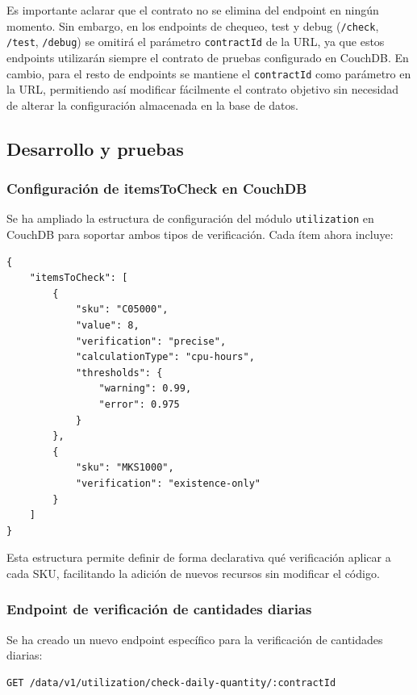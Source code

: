 Es importante aclarar que el contrato no se elimina del endpoint en ningún momento. Sin embargo, en los endpoints de chequeo, test y debug (\texttt{/check}, \texttt{/test}, \texttt{/debug}) se omitirá el parámetro \texttt{contractId} de la URL, ya que estos endpoints utilizarán siempre el contrato de pruebas configurado en CouchDB. En cambio, para el resto de endpoints se mantiene el \texttt{contractId} como parámetro en la URL, permitiendo así modificar fácilmente el contrato objetivo sin necesidad de alterar la configuración almacenada en la base de datos.

\subsection{Desarrollo y pruebas}

\subsubsection{Configuración de itemsToCheck en CouchDB}
Se ha ampliado la estructura de configuración del módulo \texttt{utilization} en CouchDB para soportar ambos tipos de verificación. Cada ítem ahora incluye:

\begin{lstlisting}[caption=Estructura de itemsToCheck en CouchDB, label=lst:items-to-check]
{
    "itemsToCheck": [
        {
            "sku": "C05000",
            "value": 8,
            "verification": "precise",
            "calculationType": "cpu-hours",
            "thresholds": {
                "warning": 0.99,
                "error": 0.975
            }
        },
        {
            "sku": "MKS1000",
            "verification": "existence-only"
        }
    ]
}
\end{lstlisting}

Esta estructura permite definir de forma declarativa qué verificación aplicar a cada SKU, facilitando la adición de nuevos recursos sin modificar el código.

\subsubsection{Endpoint de verificación de cantidades diarias}
Se ha creado un nuevo endpoint específico para la verificación de cantidades diarias:

\begin{verbatim}
GET /data/v1/utilization/check-daily-quantity/:contractId
\end{verbatim}

